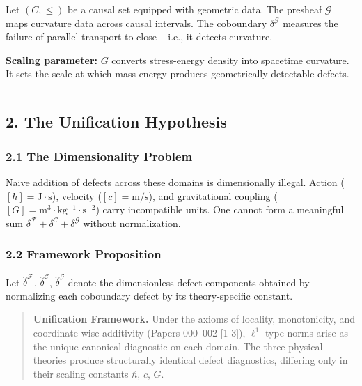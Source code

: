 \documentclass[
]{article}
\begin{document}
Let \((C, \leq)\) be a causal set equipped with geometric data. The
presheaf \(\mathcal{G}\) maps curvature data across causal intervals.
The coboundary \(\delta^\mathcal{G}\) measures the failure of parallel
transport to close -- i.e., it detects curvature.

\textbf{Scaling parameter:} \(G\) converts stress-energy density into
spacetime curvature. It sets the scale at which mass-energy produces
geometrically detectable defects.

\begin{center}\rule{0.5\linewidth}{0.5pt}\end{center}

\subsection{2. The Unification
Hypothesis}\label{the-unification-hypothesis}

\subsubsection{2.1 The Dimensionality
Problem}\label{the-dimensionality-problem}

Naive addition of defects across these domains is dimensionally illegal.
Action (\([\hbar] = \mathrm{J \cdot s}\)), velocity
(\([c] = \mathrm{m/s}\)), and gravitational coupling
(\([G] = \mathrm{m^3 \cdot kg^{-1} \cdot s^{-2}}\)) carry incompatible
units. One cannot form a meaningful sum
\(\delta^\mathcal{F} + \delta^\mathcal{C} + \delta^\mathcal{G}\) without
normalization.

\subsubsection{2.2 Framework Proposition}\label{framework-proposition}

Let \(\hat{\delta}^\mathcal{F}\), \(\hat{\delta}^\mathcal{C}\),
\(\hat{\delta}^\mathcal{G}\) denote the dimensionless defect components
obtained by normalizing each coboundary defect by its theory-specific
constant.

\begin{quote}
\textbf{Unification Framework.} Under the axioms of locality,
monotonicity, and coordinate-wise additivity (Papers 000--002
{[}1-3{]}), \(\ell^1\)-type norms arise as the unique canonical
diagnostic on each domain. The three physical theories produce
structurally identical defect diagnostics, differing only in their
scaling constants \(\hbar\), \(c\), \(G\).
\end{quote}
\end{document}
